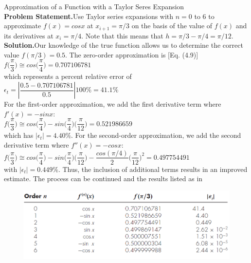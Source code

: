 \documentclass[../main.tex]{subfiles}
\begin{document}
\begin{example} Approximation of a Function with a Taylor Seres Expansion
    \bigskip\\
    \textbf{Problem Statement.}\quad Use Taylor series expansions with $n=0$ to 6 to approximate
    $f(x)=cos x$ at $x_{i+1} = \pi/3$ on the basis of the value of $f(x)$ and its derivatives
    at $x_i=\pi/4$. Note that this means that $h=\pi/3-\pi/4=\pi/12$.\\

    \noindent
    \textbf{Solution.}\quad Our knowledge of the true function allows us to determine the correct value
    $f (\pi/3) = 0.5$. The zero-order approximation is [Eq. (4.9)]\\

    $f\Big(\dfrac{\pi}{3}\Big)\cong cos\Big(\dfrac{\pi}{4}\Big)=0.707106781$\\

    \noindent
    which represents a percent relative error of\\

    $\epsilon_t = \left\lvert \dfrac{0.5-0.707106781}{0.5}\right\rvert100\%=41.1\% $\\

    \noindent
    For the first-order approximation, we add the first derivative term where $f'(x)=-sin x$:\\

    $f\Big(\dfrac{\pi}{3}\Big)\cong cos\Big(\dfrac{\pi}{4}\Big) - sin\Big(\dfrac{\pi}{4}\Big)\Big(\dfrac{\pi}{12}\Big) = 0.521986659$\\

    \noindent
    which has $\left\lvert\epsilon_t \right\rvert = 4.40\%$. For the second-order approximation, we add the second derivative
    term where $f''(x) = -cosx$:\\

    $f\Big(\dfrac{\pi}{3}\Big)\cong cos\Big(\dfrac{\pi}{4}\Big) - sin\Big(\dfrac{\pi}{4}\Big)\Big(\dfrac{\pi}{12}\Big) 
    -\dfrac{cos(\pi/4)}{2}\Big(\dfrac{\pi}{12}\Big)^2 = 0.497754491$\\

    \noindent
    with $\left\lvert\epsilon_t \right\rvert = 0.449\%$. Thus, the inclusion of additional terms results in an improved estimate.
    The process can be continued and the results listed as in\\

    \begin{figure}[h]
        \includegraphics[width=0.8\linewidth]{./images/fig_7_1}
    \end{figure}


\end{example}
\end{document}
